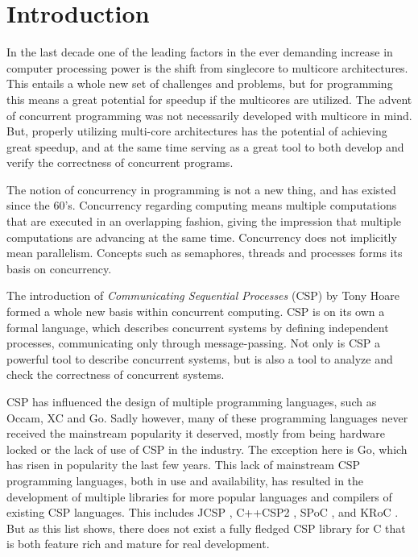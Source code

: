 
\chapter{Introduction}
\label{ch:introduction}

In the last decade one of the leading factors in the ever demanding increase in computer processing power is the shift from singlecore to multicore architectures. This entails a whole new set of challenges and problems, but for programming this means a great potential for speedup if the multicores are utilized. The advent of concurrent programming was not necessarily developed with multicore in mind. But, properly utilizing multi\hyp{}core architectures has the potential of achieving great speedup, and at the same time serving as a great tool to both develop and verify the correctness of concurrent programs. 

The notion of concurrency in programming is not a new thing, and has existed since the 60's. Concurrency regarding computing means multiple computations that are executed in an overlapping fashion, giving the impression that multiple computations are advancing at the same time. Concurrency does not implicitly mean parallelism. Concepts such as semaphores, threads and processes forms its basis on concurrency. 

The introduction of \textit{Communicating Sequential Processes} (CSP) by Tony Hoare \citep{csp} formed a whole new basis within concurrent computing. CSP is on its own a formal language, which describes concurrent systems by defining independent processes, communicating only through message-passing. Not only is CSP a powerful tool to describe concurrent systems, but is also a tool to analyze and check the correctness of concurrent systems. 

CSP has influenced the design of multiple programming languages, such as Occam, XC and Go. Sadly however, many of these programming languages never received the mainstream popularity it deserved, mostly from being hardware locked  or the lack of use of CSP in the industry. The exception here is Go, which has risen in popularity the last few years. This lack of mainstream CSP programming languages, both in use and availability, has resulted in the development of multiple libraries for more popular languages and compilers of existing CSP languages. This includes JCSP \citep{jcsp}, C++CSP2 \citep{c++csp2}, SPoC \citep{spoc}, and KRoC \citep{kroc}. But as this list shows, there does not exist a fully fledged CSP library for C that is both feature rich and mature for real development. 

